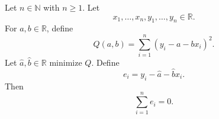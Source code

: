 \begin{theorem}
Let $n \in \mathbb{N}$ with $n \ge 1$. Let
\[
x_1,\ldots,x_n,y_1,\ldots,y_n \in \mathbb{R}.
\]
For $a,b \in \mathbb{R}$, define
\[
Q(a,b)=\sum_{i=1}^n (y_i-a-bx_i)^2.
\]
Let $\hat a,\hat b \in \mathbb{R}$ minimize $Q$. Define
\[
e_i = y_i-\hat a-\hat b x_i.
\]
Then
\[
\sum_{i=1}^n e_i=0.
\]
\end{theorem}
